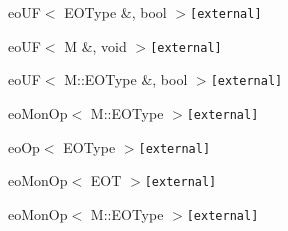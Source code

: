 \begin{CompactList}
\begin{CompactList}
\begin{CompactList}
\item {}
\end{CompactList}
\item eoUF$<$ EOType \&, bool $>${\tt  [external]}\item eoUF$<$ M \&, void $>${\tt  [external]}\begin{CompactList}
\item {}
\end{CompactList}
\item eoUF$<$ M::EOType \&, bool $>${\tt  [external]}\begin{CompactList}
\item eoMonOp$<$ M::EOType $>${\tt  [external]}\begin{CompactList}
\item {}
\begin{CompactList}
\item {}
\item {}
\item {}
\end{CompactList}
\end{CompactList}
\end{CompactList}
\end{CompactList}
\item eoOp$<$ EOType $>${\tt  [external]}\begin{CompactList}
\item eoMonOp$<$ EOT $>${\tt  [external]}\item eoMonOp$<$ M::EOType $>${\tt  [external]}\end{CompactList}
\end{CompactList}

